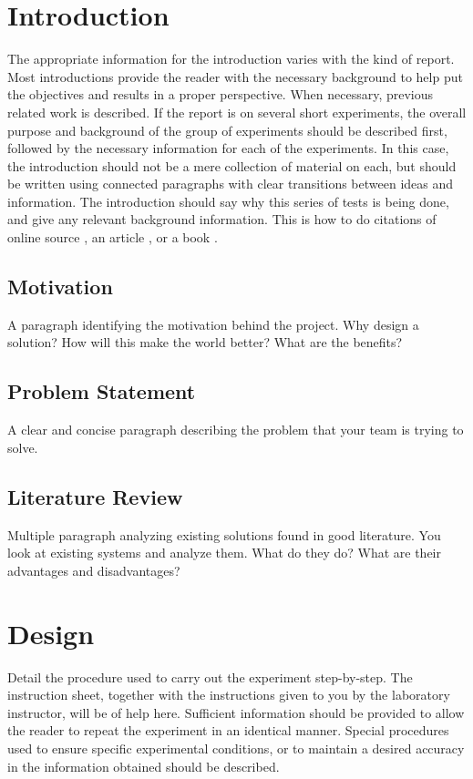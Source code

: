 \section{Introduction}
	The appropriate information for the introduction varies with the kind of report. Most introductions provide the reader with the necessary background to help put the objectives and results in a proper perspective. When necessary, previous related work is described. If the report is on several short experiments, the overall purpose and background of the group of experiments should be described first, followed by the necessary information for each of the experiments. In this case, the introduction should not be a mere collection of material on each, but should be written using connected paragraphs with clear transitions between ideas and information.
The introduction should say why this series of tests is being done, and give any relevant background information. This is how to do citations of online source \cite{biblatex}, an article \cite{einstein}, or a book \cite{book_typical}.

\subsection{Motivation}
\label{sec:motivation}
A paragraph identifying the motivation behind the project. Why design a solution? How will this make the world better? What are the benefits?


\subsection{Problem Statement}
\label{sec:ProblemStatement}
A clear and concise paragraph describing the problem that your team is trying to solve. 

\subsection{Literature Review}
\label{sec:Literature}
Multiple paragraph analyzing existing solutions found in good literature. You look at existing systems and analyze them. What do they do? What are their advantages and disadvantages? 


\section{Design}
Detail the procedure used to carry out the experiment step-by-step. The instruction sheet, together with the instructions given to you by the laboratory instructor, will be of help here. Sufficient information should be provided to allow the reader to repeat the experiment in an identical manner. Special procedures used to ensure specific experimental conditions, or to maintain a desired accuracy in the information obtained should be described.

